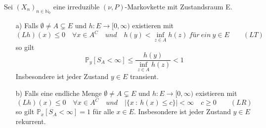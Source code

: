 \label{Folgerung Dynkin Formel, (LR), (LT)}
Sei $(X_{n})_{n \in \mathbb{N}_{0}}$ eine irreduzible $(\nu,P)$-Markovkette mit Zustandsraum E.
\begin{itemize}
\item[a)] Falls $\emptyset \neq A \subsetneq E$ und $h: E \to [0, \infty)$ existieren mit
\begin{equation*}
(Lh)(x) \leq 0 \quad \forall x \in A^{C} \quad und \quad h(y) < \inf_{z \in A} h(z) \: für \: ein \: y \in E \qquad (LT)
\end{equation*} 
so gilt
\begin{equation*}
\mathbb{P}_{y}[S_{A} < \infty] \leq \dfrac{h(y)}{\inf_{z \in A} h(z)} < 1
\end{equation*}
Insbesondere ist jeder Zustand $y \in E$ transient.
\item[b)] Falls eine endliche Menge $\emptyset \neq A \subsetneq E$ und $h: E \to [0, \infty)$ existieren mit
\begin{equation*}
(Lh)(x) \leq 0 \quad \forall x \in A^{C} \quad und \quad \vert \lbrace x \: : \: h(x) \leq c \rbrace \vert < \infty \quad c \geq 0 \qquad (LR)
\end{equation*}
so gilt $\mathbb{P}_{x}[S_{A}< \infty] = 1$ für alle $x \in E$. Insbesondere ist jeder Zustand $y \in E$ rekurrent.
\end{itemize}